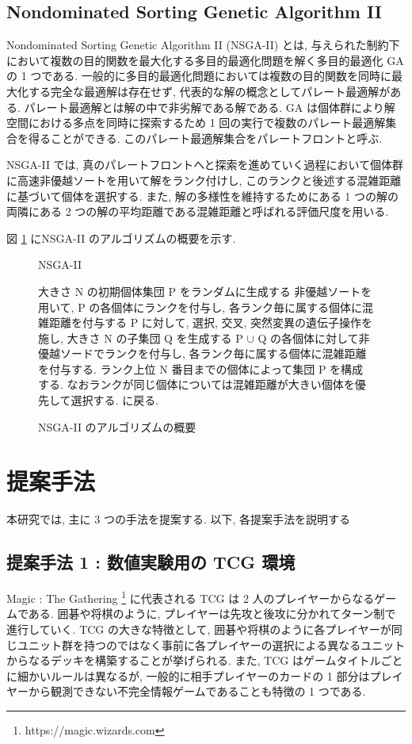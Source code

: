\documentclass[12pt]{jarticle}
\begin{document}
\subsection{Nondominated
Sorting Genetic Algorithm II}
Nondominated
Sorting Genetic Algorithm II (NSGA-II) とは, 与えられた制約下において複数の目的関数を最大化する多目的最適化問題を解く多目的最適化 GA の 1 つである. 一般的に多目的最適化問題においては複数の目的関数を同時に最大化する完全な最適解は存在せず, 代表的な解の概念としてパレート最適解がある. パレート最適解とは解の中で非劣解である解である. GA は個体群により解空間における多点を同時に探索するため 1 回の実行で複数のパレート最適解集合を得ることができる. このパレート最適解集合をパレートフロントと呼ぶ. \par
NSGA-II では, 真のパレートフロントへと探索を進めていく過程において個体群に高速非優越ソートを用いて解をランク付けし, このランクと後述する混雑距離に基づいて個体を選択する. また, 解の多様性を維持するためにある 1 つの解の両隣にある 2 つの解の平均距離である混雑距離と呼ばれる評価尺度を用いる.
\par
図 \ref{alg:NSGA2} にNSGA-II のアルゴリズムの概要を示す.
\begin{figure}[H]
  \begin{algorithm}[H]
      \caption{
        NSGA-II
        }
      \begin{algorithmic}[1] 
        \STATE 大きさ N の初期個体集団 P をランダムに生成する
        \STATE 非優越ソートを用いて, P の各個体にランクを付与し, 各ランク毎に属する個体に混雑距離を付与する
        \STATE P に対して, 選択, 交叉, 突然変異の遺伝子操作を施し, 大きさ N の子集団 Q を生成する
        \STATE P $\cup$ Q の各個体に対して非優越ソードでランクを付与し, 各ランク毎に属する個体に混雑距離を付与する. ランク上位 N 番目までの個体によって集団 P を構成する. なおランクが同じ個体については混雑距離が大きい個体を優先して選択する.
         に戻る.
      \end{algorithmic}
  \end{algorithm}
  \caption{NSGA-II のアルゴリズムの概要 \cite{NSGA-2}}
  \label{alg:NSGA2}
  \end{figure}


\clearpage
\section{提案手法}
本研究では, 主に 3 つの手法を提案する. 以下, 各提案手法を説明する

\subsection{提案手法 1 : 数値実験用の TCG 環境}
Magic : The Gathering \footnote[1]{https://magic.wizards.com} に代表される TCG は 2 人のプレイヤーからなるゲームである. 囲碁や将棋のように, プレイヤーは先攻と後攻に分かれてターン制で進行していく. TCG の大きな特徴として, 囲碁や将棋のように各プレイヤーが同じユニット群を持つのではなく事前に各プレイヤーの選択による異なるユニットからなるデッキを構築することが挙げられる. また, TCG はゲームタイトルごとに細かいルールは異なるが, 一般的に相手プレイヤーのカードの 1 部分はプレイヤーから観測できない不完全情報ゲームであることも特徴の 1 つである. 
\end{document}
